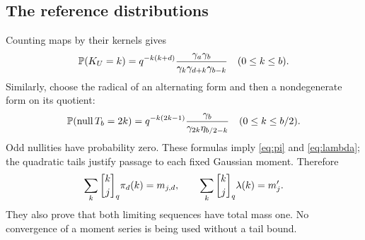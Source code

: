 \subsection{The reference distributions}

Counting maps by their kernels gives
\begin{equation}\label{eq:finite-iid}
 \mathbb P(K_U=k)
 =q^{-k(k+d)}
       \frac{\gamma_a\gamma_b}
       {\gamma_k\gamma_{d+k}\gamma_{b-k}}
       \quad(0\le k\le b).
\end{equation}
Similarly, choose the radical of an alternating form and then a
nondegenerate form on its quotient:
\begin{equation}\label{eq:finite-alt}
 \mathbb P(\operatorname{null} T_b=2k)
   =q^{-k(2k-1)}
       \frac{\gamma_b}{\gamma_{2k}\eta_{b/2-k}}
       \quad(0\le k\le b/2).
\end{equation}
Odd nullities have probability zero. These formulas imply
\eqref{eq:pi} and \eqref{eq:lambda}; the quadratic tails justify passage to each
fixed Gaussian moment. Therefore
\begin{equation}\label{eq:limit-moments}
 \sum_k\qbin k j\pi_d(k)=m_{j,d},
 \qquad
 \sum_k\qbin k j\lambda(k)=m'_j.
\end{equation}
They also prove that both limiting sequences have total mass one.
No convergence of a moment series is being used without a tail bound.

